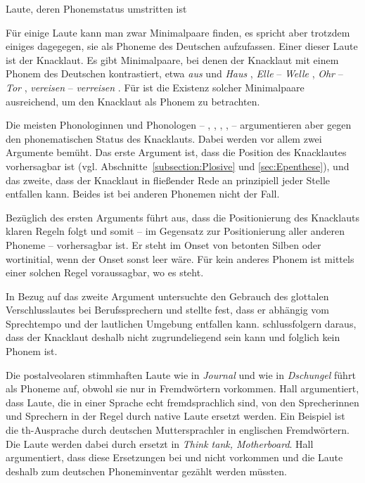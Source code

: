 \begin{Exkurs}{Laute, deren Phonemstatus umstritten ist}\label{Exkurs:Knacklaut}


Für einige Laute kann man zwar Minimalpaare finden, es spricht aber trotzdem einiges dagegegen, sie als Phoneme des Deutschen aufzufassen. Einer dieser Laute ist der Knacklaut. Es gibt Minimalpaare, bei denen der Knacklaut mit einem Phonem des Deutschen kontrastiert, etwa \textit{aus} \textipa{[PaUs]} und \textit{Haus} \textipa{[haUs]}, \textit{Elle} \textipa{[\textprimstress PE\.*{l}@]} -- \textit{Welle} \textipa{[\textprimstress vE\.*{l}@]}, \textit{Ohr} \textipa{[Po:5]}-- \textit{Tor} \textipa{[to:5]}, \textit{vereisen} \textipa{[f5\textprimstress P\t*{aI}.z\s{n}]} -- \textit{verreisen} \textipa{[f5\textprimstress K\t*{aI}.z\s{n}]}. Für \citet[40]{NoackPhonologie2016} ist die Existenz solcher Minimalpaare ausreichend, um den Knacklaut als Phonem zu betrachten.

Die meisten Phonologinnen und Phonologen -- \zB \citet{RamersVater1991}, \citet{Ramers1998}, \citet{Hall2000}, \citet{Ternes2012}, \citet{FuhrhopPeters2013} -- argumentieren aber gegen den phonematischen Status des Knacklauts. Dabei werden vor allem zwei Argumente bemüht. Das erste Argument ist, dass die Position des Knacklautes vorhersagbar ist (vgl. Abschnitte~\ref{subsection:Plosive} und \ref{sec:Epenthese}), und das zweite, dass der Knacklaut in fließender Rede an prinzipiell jeder Stelle entfallen kann. Beides ist bei anderen Phonemen nicht der Fall.

Bezüglich des ersten Arguments führt \citet[65--66]{Hall2000} aus, dass die Positionierung des Knacklauts klaren Regeln folgt und somit -- im Gegensatz zur Positionierung aller anderen Phoneme -- vorhersagbar ist. Er steht im Onset von betonten Silben oder wortinitial, wenn der Onset sonst leer wäre. Für kein anderes Phonem ist mittels einer solchen Regel voraussagbar, wo es steht.

In Bezug auf das zweite Argument untersuchte \citet{Krech1968} den Gebrauch des glottalen Verschlusslautes bei Berufssprechern und stellte fest, dass er abhängig vom Sprechtempo und der lautlichen Umgebung entfallen kann. \citet[96]{RamersVater1991} schlussfolgern daraus, dass der Knacklaut deshalb nicht zugrundeliegend sein kann und folglich kein Phonem ist. 

Die postalveolaren stimmhaften Laute  wie in \textit{Journal} und  wie in \textit{Dschungel} führt \citet[68]{Hall2000} als Phoneme auf, obwohl sie nur in Fremdwörtern vorkommen. Hall argumentiert, dass Laute, die in einer Sprache echt fremdsprachlich sind, von den Sprecherinnen und Sprechern in der Regel durch native Laute ersetzt werden. Ein Beispiel ist die th-Ausprache durch deutschen Muttersprachler in englischen Fremdwörtern. Die Laute \textipa{[T, D]} werden dabei durch \textipa{[s, z]} ersetzt \zB in \textit{Think tank, Motherboard}. Hall argumentiert, dass diese Ersetzungen bei  und  nicht vorkommen und die Laute deshalb zum deutschen Phoneminventar gezählt werden müssten. 


\end{Exkurs}
